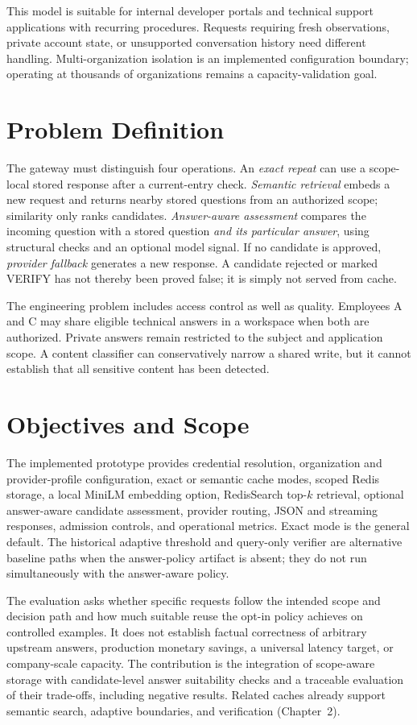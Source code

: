 This model is suitable for internal developer portals and technical support applications with recurring procedures. Requests requiring fresh observations, private account state, or unsupported conversation history need different handling. Multi-organization isolation is an implemented configuration boundary; operating at thousands of organizations remains a capacity-validation goal.

\section{Problem Definition}
The gateway must distinguish four operations. An \emph{exact repeat} can use a scope-local stored response after a current-entry check. \emph{Semantic retrieval} embeds a new request and returns nearby stored questions from an authorized scope; similarity only ranks candidates. \emph{Answer-aware assessment} compares the incoming question with a stored question \emph{and its particular answer}, using structural checks and an optional model signal. If no candidate is approved, \emph{provider fallback} generates a new response. A candidate rejected or marked VERIFY has not thereby been proved false; it is simply not served from cache.

The engineering problem includes access control as well as quality. Employees A and C may share eligible technical answers in a workspace when both are authorized. Private answers remain restricted to the subject and application scope. A content classifier can conservatively narrow a shared write, but it cannot establish that all sensitive content has been detected.

\section{Objectives and Scope}
The implemented prototype provides credential resolution, organization and provider-profile configuration, exact or semantic cache modes, scoped Redis storage, a local MiniLM embedding option, RedisSearch top-$k$ retrieval, optional answer-aware candidate assessment, provider routing, JSON and streaming responses, admission controls, and operational metrics. Exact mode is the general default. The historical adaptive threshold and query-only verifier are alternative baseline paths when the answer-policy artifact is absent; they do not run simultaneously with the answer-aware policy.

The evaluation asks whether specific requests follow the intended scope and decision path and how much suitable reuse the opt-in policy achieves on controlled examples. It does not establish factual correctness of arbitrary upstream answers, production monetary savings, a universal latency target, or company-scale capacity. The contribution is the integration of scope-aware storage with candidate-level answer suitability checks and a traceable evaluation of their trade-offs, including negative results. Related caches already support semantic search, adaptive boundaries, and verification (Chapter~2).

